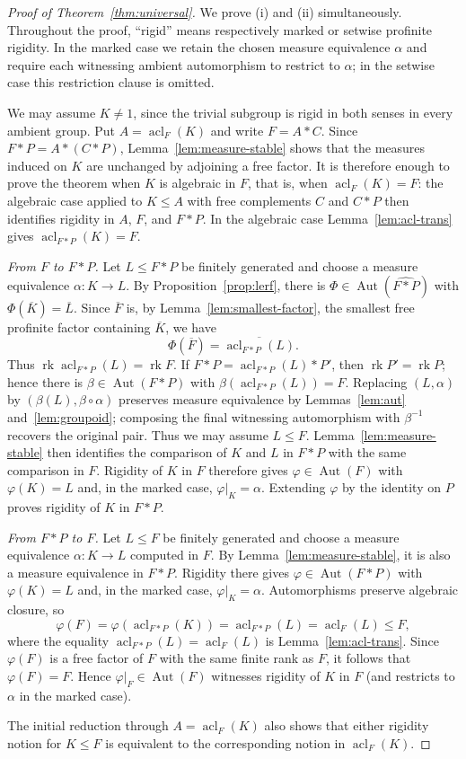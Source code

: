 \documentclass[10pt,a4paper]{amsart}
\newcommand{\Aut}{\operatorname{Aut}}
\newcommand{\acl}{\operatorname{acl}}
\newcommand{\rk}{\operatorname{rk}}
\begin{document}
\begin{proof}[Proof of Theorem~\ref{thm:universal}]
We prove (i) and (ii) simultaneously. Throughout the proof, ``rigid'' means
respectively marked or setwise profinite rigidity. In the marked case we retain
the chosen measure equivalence $\alpha$ and require each witnessing ambient
automorphism to restrict to $\alpha$; in the setwise case this restriction
clause is omitted.

We may assume $K\neq1$, since the trivial subgroup is rigid in both senses in
every ambient group. Put $A=\acl_F(K)$ and write $F=A*C$. Since
$F*P=A*(C*P)$, Lemma~\ref{lem:measure-stable} shows that the measures induced on
$K$ are unchanged by adjoining a free factor. It is therefore enough to prove
the theorem when $K$ is algebraic in $F$, that is, when $\acl_F(K)=F$: the
algebraic case applied to $K\le A$ with free complements $C$ and $C*P$ then
identifies rigidity in $A$, $F$, and $F*P$. In the algebraic case
Lemma~\ref{lem:acl-trans} gives $\acl_{F*P}(K)=F$.

\medskip\noindent\emph{From $F$ to $F*P$.}
Let $L\le F*P$ be finitely generated and choose a measure equivalence
$\alpha\colon K\to L$. By Proposition~\ref{prop:lerf}, there is
$\Phi\in\Aut(\widehat{F*P})$ with $\Phi(\overline K)=\overline L$. Since
$\overline F$ is, by Lemma~\ref{lem:smallest-factor}, the smallest free
profinite factor containing $\overline K$, we have
\[
  \Phi(\overline F)=\overline{\acl_{F*P}(L)}.
\]
Thus $\rk\acl_{F*P}(L)=\rk F$. If
$F*P=\acl_{F*P}(L)*P'$, then $\rk P'=\rk P$; hence there is
$\beta\in\Aut(F*P)$ with $\beta(\acl_{F*P}(L))=F$. Replacing
$(L,\alpha)$ by $(\beta(L),\beta\circ\alpha)$ preserves measure
equivalence by Lemmas~\ref{lem:aut} and~\ref{lem:groupoid}; composing the
final witnessing automorphism with $\beta^{-1}$ recovers the original pair.
Thus we may assume $L\le F$. Lemma~\ref{lem:measure-stable} then identifies the comparison of
$K$ and $L$ in $F*P$ with the same comparison in $F$. Rigidity of $K$ in $F$
therefore gives $\varphi\in\Aut(F)$ with $\varphi(K)=L$ and, in the marked
case, $\varphi|_K=\alpha$. Extending $\varphi$ by the identity on $P$ proves
rigidity of $K$ in $F*P$.

\medskip\noindent\emph{From $F*P$ to $F$.}
Let $L\le F$ be finitely generated and choose a measure equivalence
$\alpha\colon K\to L$ computed in $F$. By Lemma~\ref{lem:measure-stable}, it is
also a measure equivalence in $F*P$. Rigidity there gives
$\varphi\in\Aut(F*P)$ with $\varphi(K)=L$ and, in the marked case,
$\varphi|_K=\alpha$. Automorphisms preserve algebraic closure, so
\[
  \varphi(F)=\varphi(\acl_{F*P}(K))
  =\acl_{F*P}(L)=\acl_F(L)\le F,
\]
where the equality $\acl_{F*P}(L)=\acl_F(L)$ is Lemma~\ref{lem:acl-trans}. Since $\varphi(F)$ is
a free factor of $F$ with the same finite rank as $F$, it follows that
$\varphi(F)=F$. Hence $\varphi|_F\in\Aut(F)$ witnesses rigidity of $K$ in $F$
(and restricts to $\alpha$ in the marked case).

The initial reduction through $A=\acl_F(K)$ also shows that either rigidity
notion for $K\le F$ is equivalent to the corresponding notion in
$\acl_F(K)$.
\end{proof}
\end{document}
